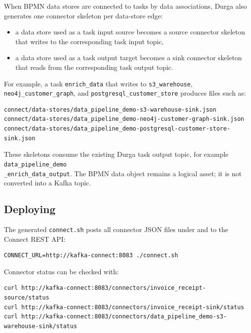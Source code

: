 When BPMN data stores are connected to tasks by data associations, Durga also
generates one connector skeleton per data-store edge:

\begin{itemize}
\item a data store used as a task input source becomes a source connector
      skeleton that writes to the corresponding task input topic,
\item a data store used as a task output target becomes a sink connector
      skeleton that reads from the corresponding task output topic.
\end{itemize}

For example, a task \texttt{enrich\_data} that writes to
\texttt{s3\_warehouse}, \texttt{neo4j\_customer\_graph}, and
\texttt{postgresql\_customer\_store} produces files such as:

\begin{verbatim}
connect/data-stores/data_pipeline_demo-s3-warehouse-sink.json
connect/data-stores/data_pipeline_demo-neo4j-customer-graph-sink.json
connect/data-stores/data_pipeline_demo-postgresql-customer-store-sink.json
\end{verbatim}

These skeletons consume the existing Durga task output topic, for example
\texttt{data\_pipeline\_demo\\ \_enrich\_data\_output}. The BPMN data object
remains a logical asset; it is not converted into a Kafka topic.

\subsection{Deploying}

The generated \texttt{connect.sh} posts all connector JSON files under
 and  to the Connect REST API:

\begin{verbatim}
CONNECT_URL=http://kafka-connect:8083 ./connect.sh
\end{verbatim}

Connector status can be checked with:

\begin{verbatim}
curl http://kafka-connect:8083/connectors/invoice_receipt-source/status
curl http://kafka-connect:8083/connectors/invoice_receipt-sink/status
curl http://kafka-connect:8083/connectors/data_pipeline_demo-s3-warehouse-sink/status
\end{verbatim}

